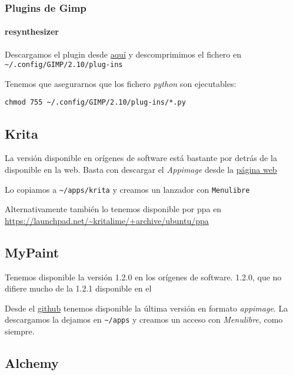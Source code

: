 \documentclass[
  12pt,
  spanish,
]{article}
\begin{document}
\hypertarget{plugins-de-gimp}{%
\subsubsection{Plugins de Gimp}\label{plugins-de-gimp}}

\hypertarget{resynthesizer}{%
\paragraph{resynthesizer}\label{resynthesizer}}

Descargamos el plugin desde
\href{https://github.com/bootchk/resynthesizer}{aquí} y descomprimimos
el fichero en \texttt{\textasciitilde{}/.config/GIMP/2.10/plug-ins}

Tenemos que asegurarnos que los fichero \emph{python} son ejecutables:

\begin{verbatim}
chmod 755 ~/.config/GIMP/2.10/plug-ins/*.py
\end{verbatim}

\hypertarget{krita}{%
\subsection{Krita}\label{krita}}

La versión disponible en orígenes de software está bastante por detrás
de la disponible en la web. Basta con descargar el \emph{Appimage} desde
la \href{https://krita.org}{página web}

Lo copiamos a \texttt{\textasciitilde{}/apps/krita} y creamos un
lanzador con \texttt{Menulibre}

Alternativamente también lo tenemos disponible por ppa en
\url{https://launchpad.net/~kritalime/+archive/ubuntu/ppa}

\hypertarget{mypaint}{%
\subsection{MyPaint}\label{mypaint}}

Tenemos disponible la versión 1.2.0 en los orígenes de software. 1.2.0,
que no difiere mucho de la 1.2.1 disponible en el

Desde el \href{https://github.com/mypaint/}{github} tenemos disponible
la última versión en formato \emph{appimage}. La descargamos la dejamos
en \texttt{\textasciitilde{}/apps} y creamos un acceso con
\emph{Menulibre}, como siempre.

\hypertarget{alchemy}{%
\subsection{Alchemy}\label{alchemy}}
\end{document}
